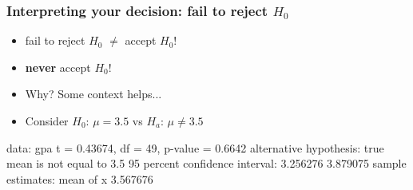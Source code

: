 
\begin{frame}[fragile]
\frametitle{Interpreting your decision: fail to reject $H_0$}
\begin{itemize}
\item fail to reject $H_0$ $\neq$ accept $H_0$!
\item \textbf{never} accept $H_0$!
\item Why?  Some context helps...
\item[] Consider $H_0$: $\mu=3.5$ vs $H_a$: $\mu \neq 3.5$
\end{itemize}
\begin{lcverbatim}
data:  gpa
t = 0.43674, df = 49, p-value = 0.6642
alternative hypothesis: true mean is not equal to 3.5
95 percent confidence interval:
 3.256276 3.879075
sample estimates:
mean of x
 3.567676 
\end{lcverbatim}
\vskip200pt
\end{frame}

